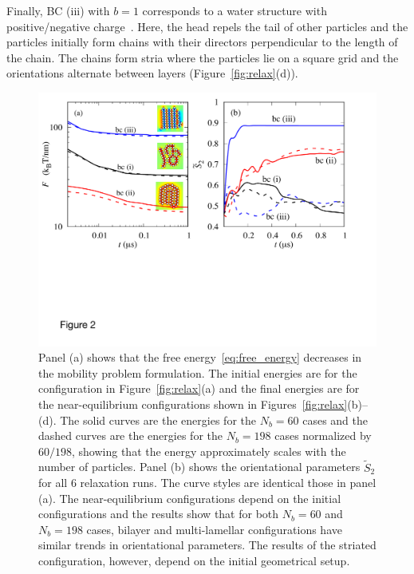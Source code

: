 \documentclass[prb,preprint,showpacs,preprintnumbers,amsmath,amssymb,longbibliography]{revtex4-1}
\begin{document}
Finally, BC (iii) with $b=1$ corresponds to a water structure with
positive/negative charge~\cite{MaRa76, Ma77}. Here, the head repels the
tail of other particles and the particles initially form chains with
their directors perpendicular to the length of the chain. The chains
form stria where the particles lie on a square grid and the orientations
alternate between layers (Figure~\ref{fig:relax}(d)).

\begin{figure}
  \begin{center}
\includegraphics[width=1.0\textwidth]{Figures/Figure2.pdf}
  \end{center}
  \vspace{-20pt}
  \caption{\label{fig:relax_energy}
  Panel (a) shows that the free energy~\eqref{eq:free_energy} decreases
  in the mobility problem formulation. The initial energies are for the
  configuration in Figure~\ref{fig:relax}(a) and the final energies are
  for the near-equilibrium configurations shown in
  Figures~\ref{fig:relax}(b)--(d). The solid curves are the energies for
  the $N_b=60$ cases and the dashed curves are the energies for the $N_b
  = 198$ cases normalized by $60/198$, showing that the energy
  approximately scales with the number of particles.  Panel (b) shows
  the orientational parameters $\tilde{S}_2$ for all 6 relaxation runs.
  The curve styles are identical those in panel (a). The
  near-equilibrium configurations depend on the initial configurations
  and the results show that for both $N_b=60$ and $N_b=198$ cases,
  bilayer and multi-lamellar configurations have similar trends in
  orientational parameters. The results of the striated configuration,
  however, depend on the initial geometrical setup.}
\end{figure}
\end{document}
